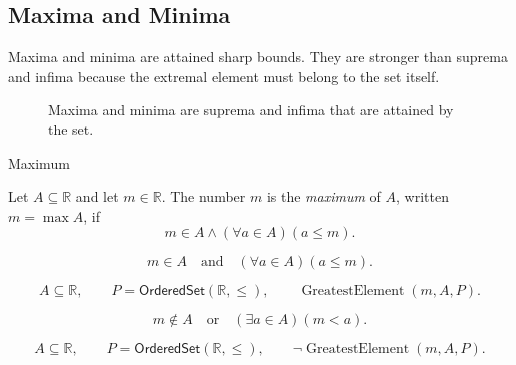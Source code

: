 \subsection{Maxima and Minima}

\begin{remark*}[Exposition]
Maxima and minima are attained sharp bounds.  They are stronger than
suprema and infima because the extremal element must belong to the set
itself.
\end{remark*}

\begin{figure}[htbp]
  \centering
  
  \caption{Maxima and minima are suprema and infima that are attained by the set.}
  \label{fig:maxima-minima-combinations}
\end{figure}

\begin{definitionbox}{Maximum}
\begin{definition}[Maximum]
\label{def:maximum}
Let $A\subseteq\mathbb{R}$ and let $m\in\mathbb{R}$. The number $m$ is the
\emph{maximum} of $A$, written $m=\max A$, if
\[
  m\in A
  \land
  (\forall a\in A)(a\leq m).
\]
\end{definition}
\end{definitionbox}

\begin{remark*}
\[
  m\in A
  \quad\text{and}\quad
  (\forall a\in A)(a\leq m).
\]
\end{remark*}

\begin{remark*}
\[
  A\subseteq\mathbb{R},\qquad P=\mathsf{OrderedSet}(\mathbb{R},\leq),\qquad
  \operatorname{GreatestElement}(m,A,P).
\]
\end{remark*}

\begin{remark*}
\[
  m\notin A
  \quad\text{or}\quad
  (\exists a\in A)(m<a).
\]
\end{remark*}

\begin{remark*}
\[
  A\subseteq\mathbb{R},\qquad P=\mathsf{OrderedSet}(\mathbb{R},\leq),\qquad
  \neg\operatorname{GreatestElement}(m,A,P).
\]
\end{remark*}

